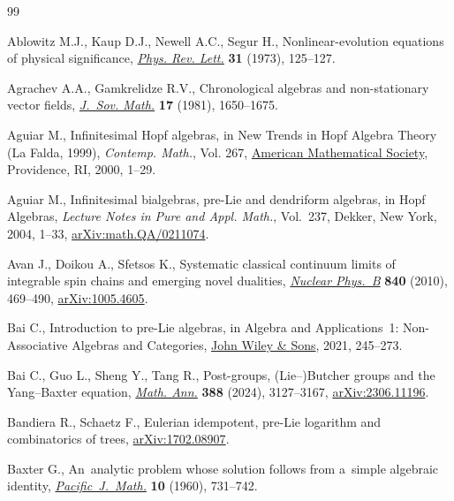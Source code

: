 \documentclass[pdftex]{sigma}
\numberwithin{equation}{section}
\theoremstyle{definition}
\begin{document}
\begin{thebibliography}{99}
\footnotesize\itemsep=0pt

Ablowitz M.J., Kaup D.J., Newell A.C., Segur H., Nonlinear-evolution equations
 of physical significance,
 \href{https://doi.org/10.1103/PhysRevLett.31.125}{\textit{Phys. Rev. Lett.}}
 \textbf{31} (1973), 125--127.

Agrachev A.A., Gamkrelidze R.V., Chronological algebras and non-stationary
 vector fields, \href{https://doi.org/10.1007/BF01084595}{\textit{J.~Sov.
 Math.}} \textbf{17} (1981), 1650--1675.

Aguiar M., Infinitesimal {H}opf algebras, in New Trends in {H}opf Algebra
 Theory ({L}a {F}alda, 1999), \textit{Contemp. Math.}, Vol. 267,
 \href{https://doi.org/10.1090/conm/267/04262}{American Mathematical Society},
 Providence, RI, 2000, 1--29.

Aguiar M., Infinitesimal bialgebras, pre-{L}ie and dendriform algebras, in Hopf
 Algebras, \textit{Lecture Notes in Pure and Appl. Math.}, Vol.~237, Dekker,
 New York, 2004, 1--33,
 \href{http://arxiv.org/abs/math.QA/0211074}{arXiv:math.QA/0211074}.

Avan J., Doikou A., Sfetsos K., Systematic classical continuum limits of
 integrable spin chains and emerging novel dualities,
 \href{https://doi.org/10.1016/j.nuclphysb.2010.07.014}{\textit{Nuclear
 Phys.~B}} \textbf{840} (2010), 469--490,
 \href{http://arxiv.org/abs/1005.4605}{arXiv:1005.4605}.

Bai C., Introduction to pre-{L}ie algebras, in Algebra and Applications~1:
 Non-Associative Algebras and Categories,
 \href{https://doi.org/10.1002/9781119818175.ch7}{John Wiley \& Sons}, 2021,
 245--273.

Bai C., Guo L., Sheng Y., Tang R., Post-groups, ({L}ie--){B}utcher groups and
 the {Y}ang--{B}axter equation,
 \href{https://doi.org/10.1007/s00208-023-02592-z}{\textit{Math. Ann.}}
 \textbf{388} (2024), 3127--3167,
 \href{http://arxiv.org/abs/2306.11196}{arXiv:2306.11196}.

Bandiera R., Schaetz F., Eulerian idempotent, pre-{L}ie logarithm and
 combinatorics of trees,
 \href{http://arxiv.org/abs/1702.08907}{arXiv:1702.08907}.

Baxter G., An~analytic problem whose solution follows from a~simple algebraic
 identity,
 \href{https://doi.org/10.2140/pjm.1960.10.731}{\textit{Pacific~J.~Math.}}
 \textbf{10} (1960), 731--742.


\end{thebibliography}
\end{document}
